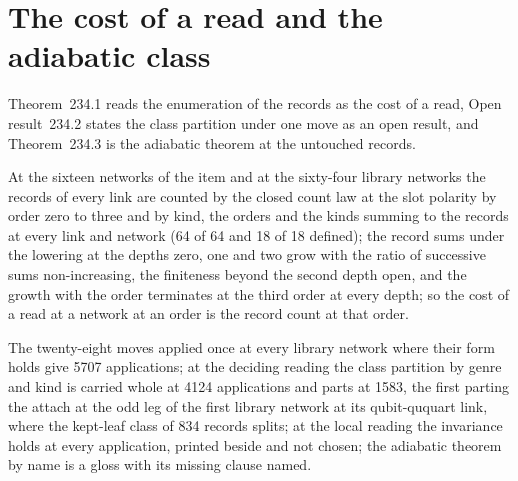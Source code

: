 \par\medskip{}\label{narr:close:13-4}\par
\section{The cost of a read and the adiabatic class}\label{mod:XIII-5-cost-of-a-read-and-the-adiabatic-class}
\label{narr:open:13-5}Theorem~234.1 reads the enumeration of the records as the cost of a read, Open result~234.2 states the class partition under one move as an open result, and Theorem~234.3 is the adiabatic theorem at the untouched records.
\begin{chtheorem}\label{box:XIII-5-cost-of-a-read-and-the-adiabatic-class:1}
At the sixteen networks of the item and at the sixty-four library networks the records of every link are counted by the closed count law at the slot polarity by order zero to three and by kind, the orders and the kinds summing to the records at every link and network (64 of 64 and 18 of 18 defined); the record sums under the lowering at the depths zero, one and two grow with the ratio of successive sums non-increasing, the finiteness beyond the second depth open, and the growth with the order terminates at the third order at every depth; so the cost of a read at a network at an order is the record count at that order.
\end{chtheorem}
\begin{chwall}\label{box:XIII-5-cost-of-a-read-and-the-adiabatic-class:2}
The twenty-eight moves applied once at every library network where their form holds give 5707 applications; at the deciding reading the class partition by genre and kind is carried whole at 4124 applications and parts at 1583, the first parting the attach at the odd leg of the first library network at its qubit-ququart link, where the kept-leaf class of 834 records splits; at the local reading the invariance holds at every application, printed beside and not chosen; the adiabatic theorem by name is a gloss with its missing clause named.
\end{chwall}
